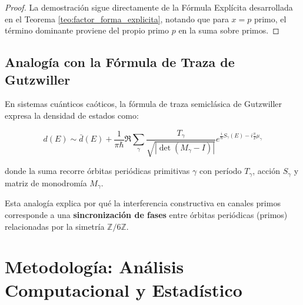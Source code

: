 \documentclass[12pt, a4paper]{article}
\theoremstyle{plain}
\theoremstyle{definition}
\theoremstyle{remark}
\begin{document}
\begin{proof}
La demostración sigue directamente de la Fórmula Explícita desarrollada en el 
Teorema \ref{teo:factor_forma_explicita}, notando que para $x = p$ primo, el 
término dominante proviene del propio primo $p$ en la suma sobre primos.
\end{proof}

\subsection{Analogía con la Fórmula de Traza de Gutzwiller}
\label{subsec:gutzwiller_analogy}

En sistemas cuánticos caóticos, la fórmula de traza semiclásica de Gutzwiller 
expresa la densidad de estados como:

\[
d(E) \sim \bar{d}(E) + \frac{1}{\pi\hbar} \Re \sum_{\gamma} \frac{T_\gamma}{\sqrt{|\det(M_\gamma - I)|}} 
e^{\frac{i}{\hbar}S_\gamma(E) - i\frac{\pi}{2}\mu_\gamma}
\]

donde la suma recorre órbitas periódicas primitivas $\gamma$ con período $T_\gamma$, 
acción $S_\gamma$ y matriz de monodromía $M_\gamma$.

\begin{center}
\end{center}

Esta analogía explica por qué la interferencia constructiva en canales primos 
corresponde a una \textbf{sincronización de fases} entre órbitas periódicas 
(primos) relacionadas por la simetría $\mathbb{Z}/6\mathbb{Z}$.

\section{Metodología: Análisis Computacional y Estadístico}
\label{sec:metodologia}
\end{document}
